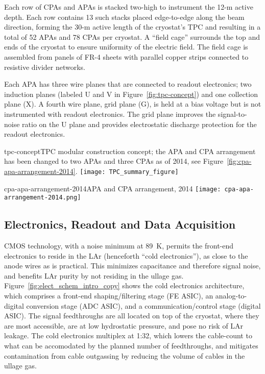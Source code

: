  Each row of CPAs and APAs is 
 stacked two-high to instrument the 12-m active depth. Each row contains 13 such stacks placed edge-to-edge along the beam direction, forming the 30-m
 active length of the cryostat's TPC and resulting in a total of 52 APAs and 78 CPAs per cryostat. A ``field cage'' surrounds the top and ends of the cryostat to ensure uniformity of the electric field. The field cage is assembled from
 panels of FR-4 sheets with parallel copper strips connected to resistive divider networks.

Each APA has three wire planes that are connected to readout electronics; two induction planes (labeled U and V in Figure~\ref{fig:tpc-concept}) and one collection plane (X). A fourth wire plane, grid plane (G), is held at a bias voltage but is not instrumented with readout electronics. The grid plane improves the signal-to-noise ratio on the U plane and provides electrostatic discharge protection for the readout electronics.

\begin{cdrfigure}{tpc-concept}{TPC modular construction concept; the APA and CPA arrangement has been changed to two APAs and three CPAs as of 2014, see Figure~\ref{fig:cpa-apa-arrangement-2014}.}
\texttt{[image: TPC\_summary\_figure]}
\end{cdrfigure}

\begin{cdrfigure}{cpa-apa-arrangement-2014}{APA and CPA arrangement, 2014}
 \texttt{[image: cpa-apa-arrangement-2014.png]}
\end{cdrfigure}

\subsection{Electronics, Readout and Data Acquisition}
\label{sec:det_electronics}


CMOS technology, with a noise minimum at 89~K,
permits the front-end electronics to reside in the LAr (henceforth ``cold electronics''),
as close to the anode wires as is practical.
This minimizes capacitance and therefore signal noise,
and benefits LAr purity by not residing in the ullage gas.
Figure~\ref{fig:elect_schem_intro_copy} shows the cold electronics architecture,
which comprises a front-end shaping/filtering stage (FE ASIC),
an analog-to-digital conversion stage (ADC ASIC), and a communication/control stage (digital ASIC).
The signal feedthroughs are all located on top of the cryostat, where they are most accessible,
are at low hydrostatic pressure, and pose no risk of LAr leakage.
The cold electronics multiplex at 1:32,
which lowers the cable-count to what can be accomodated by the planned number of feedthroughs,
and mitigates contamination from cable outgassing
by reducing the volume of cables in the ullage gas.

